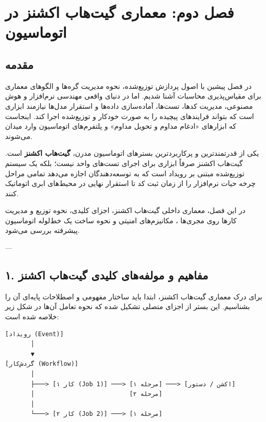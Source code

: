 \documentclass[12pt,a4paper,openany]{book}
\begin{document}
\chapter{فصل دوم: معماری گیت‌هاب اکشنز در اتوماسیون}

\section{مقدمه}

در فصل پیشین با اصول پردازش توزیع‌شده، نحوه مدیریت گره‌ها و الگوهای معماری برای مقیاس‌پذیری محاسبات آشنا شدیم. اما در دنیای واقعی مهندسی نرم‌افزار و هوش مصنوعی، مدیریت کدها، تست‌ها، آماده‌سازی داده‌ها و استقرار مدل‌ها نیازمند ابزاری است که بتواند فرایندهای پیچیده را به صورت خودکار و توزیع‌شده اجرا کند. اینجاست که ابزارهای «ادغام مداوم و تحویل مداوم»  و پلتفرم‌های اتوماسیون وارد میدان می‌شوند.

یکی از قدرتمندترین و پرکاربردترین بسترهای اتوماسیون مدرن، \textbf{گیت‌هاب اکشنز } است. گیت‌هاب اکشنز صرفاً ابزاری برای اجرای تست‌های واحد نیست؛ بلکه یک سیستم توزیع‌شده مبتنی بر رویداد  است که به توسعه‌دهندگان اجازه می‌دهد تمامی مراحل چرخه حیات نرم‌افزار را از زمان ثبت کد تا استقرار نهایی در محیط‌های ابری اتوماتیک کنند.

در این فصل، معماری داخلی گیت‌هاب اکشنز، اجزای کلیدی، نحوه توزیع و مدیریت کارها روی مجری‌ها ، مکانیزم‌های امنیتی و نحوه ساخت یک خط‌لوله  اتوماسیون پیشرفته بررسی می‌شود.

---

\section{۱. مفاهیم و مولفه‌های کلیدی گیت‌هاب اکشنز}

برای درک معماری گیت‌هاب اکشنز، ابتدا باید ساختار مفهومی و اصطلاحات پایه‌ای آن را بشناسیم. این بستر از اجزای متصلی تشکیل شده که نحوه تعامل آن‌ها در شکل زیر خلاصه شده است:

\begin{LTR}
\begin{verbatim}
[رویداد (Event)]
       │
       ▼
[گردش‌کار (Workflow)]
       │
       ├───> [کار ۱ (Job 1)] ───> [مرحله ۱] ───> [اکشن / دستور]
       │                          [مرحله ۲]
       │
       └───> [کار ۲ (Job 2)] ───> [مرحله ۱]
\end{verbatim}
\end{LTR}
\end{document}
